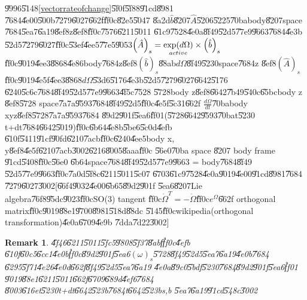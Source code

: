 \documentclass[12pt]{article}
\newtheorem{remark}[theorem]{Remark}
\begin{document}
\U{9996}\U{5148}\ref{vectorrateofchange}\U{5f0f}\U{5f88}\U{91cd}\U{8981}%
\U{7684}\U{4e00}\U{500b}\U{7279}\U{6027}\U{662f}\U{ff0c}\U{82e5}\U{5047}%
\U{8a2d}$\hat{b}$\U{8207}$\hat{A}$\U{5206}\U{5225}\U{70ba}body\U{8207}space%
\U{7684}\U{5ea7}\U{6a19}\U{8ef8}z\U{8ef8}\U{ff0c}\U{7576}\U{6211}\U{5011}%
\U{61c9}\U{7528}\U{4e0a}\U{8f49}\U{52d5}\U{77e9}\U{9663}\U{7684}\U{4e3b}%
\U{52d5}\U{7279}\U{6027}\U{ff0c}\U{53ef}\U{4ee5}\U{77e5}\U{9053}$\left( \hat{%
A}\right) _{s}=\underset{active}{\exp (d\Omega )}\times \left( \hat{b}%
\right) _{s}$\U{ff0c}\U{9019}\U{4ee3}\U{8868}\U{4e86}body\U{7684}z\U{8ef8}$%
\left( \hat{b}\right) _{s}$\U{88ab}$d\Omega $\U{8f49}\U{5230}space\U{7684}z%
\U{8ef8}$\left( \hat{A}\right) _{s}$\U{ff0c}\U{9019}\U{4e5f}\U{4ee3}\U{8868}$%
d\Omega $\U{53d6}\U{5176}\U{4e3b}\U{52d5}\U{7279}\U{6027}\U{6642}\U{5176}%
\U{6240}\U{5c6c}\U{7684}\U{8f49}\U{52d5}\U{77e9}\U{9663}\U{4f5c}\U{7528}%
\U{5728}body z\U{8ef8}\U{6642}\U{7b49}\U{540c}\U{65bc}body z \U{8ef8}\U{5728}%
space\U{7a7a}\U{9593}\U{7684}\U{8f49}\U{52d5}\U{ff0c}\U{4e5f}\U{5c31}\U{662f}%
$\frac{d\Omega }{dt}$\U{70ba}body xyz\U{8ef8}\U{5728}\U{7a7a}\U{9593}\U{7684}%
\U{89d2}\U{901f}\U{5ea6}\U{ff01}(\U{5728}\U{6642}\U{9593}\U{70ba}t\U{5230}%
t+dt\U{7684}\U{6642}\U{5019})\U{ff0c}\U{6b64}\U{4e8b}\U{5be6}\U{5c0d}\U{4efb}%
\U{610f}\U{5411}\U{91cf}\U{90fd}\U{6210}\U{7acb}\U{ff0c}\U{6240}\U{4ee5}body
x, y\U{8ef8}\U{4e5f}\U{6210}\U{7acb}\U{3002}\U{6216}\U{8005}\U{8aaa}\U{ff0c}%
\U{56e0}\U{70ba} space \U{8207} body frame \U{91cd}\U{5408}\U{ff0c}\U{56e0}%
\U{6b64}space\U{7684}\U{8f49}\U{52d5}\U{77e9}\U{9663} = body\U{7684}\U{8f49}%
\U{52d5}\U{77e9}\U{9663}\U{ff0c}\U{7a0d}\U{5f8c}\U{6211}\U{5011}\U{5c07}%
\U{6703}\U{61c9}\U{7528}\U{4e0a}\U{9019}\U{4e00}\U{91cd}\U{8981}\U{7684}%
\U{7279}\U{6027}\U{3002}[\U{66f4}\U{9032}\U{4e00}\U{6b65}\U{89d2}\U{901f}%
\U{5ea6}\U{8207}Lie algebra\U{76f8}\U{95dc}\U{9023}\U{ff0c}SO(3) tangent%
\U{ff0c}$\dot{\Omega}^{T}=-\dot{\Omega}$\U{ff0c}$e^{\Omega }$\U{662f}%
orthogonal matrix\U{ff0c}\U{9019}\U{88e1}\U{9700}\U{8981}\U{518d}\U{88dc}%
\U{5145}\U{ff0c}wikipedia(orthogonal transformation)\U{4e0a}\U{6709}\U{4e9b}%
\U{7dda}\U{7d22}\U{3002}]

\begin{remark}
\U{4f46}\U{6211}\U{5011}\U{5fc5}\U{9808}\U{5f37}\U{8abf}\U{ff0c}\U{4efb}%
\U{610f}\U{60c5}\U{6cc1}\U{4e0b}\U{ff0c}\U{89d2}\U{901f}\U{5ea6}$\left(
\omega \right) _{s}$\U{5728}\U{8f49}\U{52d5}\U{5ea7}\U{6a19}\U{4e0b}\U{7684}%
\U{6295}\U{5f71}\U{4e26}\U{4e0d}\U{662f}\U{8f49}\U{52d5}\U{5ea7}\U{6a19}%
\U{4e0a}\U{89c0}\U{5bdf}\U{5230}\U{7684}\U{89d2}\U{901f}\U{5ea6}\U{ff01}%
\U{9019}\U{88e1}\U{6211}\U{5011}\U{662f}\U{6709}\U{689d}\U{4ef6}\U{7684}%
\U{8003}\U{616e}t\U{5230}t+dt\U{6642}\U{523b}\U{7684}t\U{6642}\U{523b}s,b%
\U{5ea7}\U{6a19}\U{91cd}\U{548c}\U{3002}
\end{remark}
\end{document}
